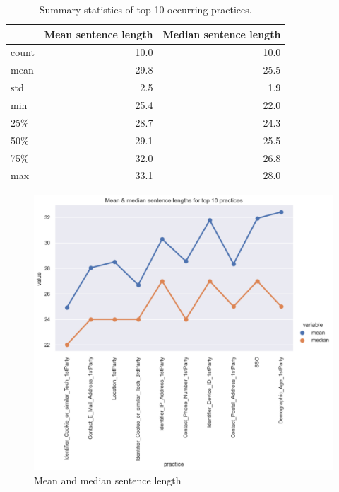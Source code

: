 \begin{table}[!ht]
	\centering
	\begin{tabular}{lrr}
		\toprule
		{} &  Mean sentence length &  Median sentence length \\
		\midrule
		count &             10.0 &               10.0 \\
		mean  &             29.8 &               25.5 \\
		std   &              2.5 &                1.9 \\
		min   &             25.4 &               22.0 \\
		25\%   &             28.7 &               24.3 \\
		50\%   &             29.1 &               25.5 \\
		75\%   &             32.0 &               26.8 \\
		max   &             33.1 &               28.0 \\
		\bottomrule
	\end{tabular}
	\caption{Summary statistics of top 10 occurring practices.}
	\label{tab:summary_top_10_practices}
\end{table}

\begin{figure}[!ht]
	\centering
	\includegraphics[width=1\textwidth]{figures/eda_mean_median.png}      
    \caption{Mean and median sentence length}
    \label{fig:graph_sentence_length}
\end{figure}


